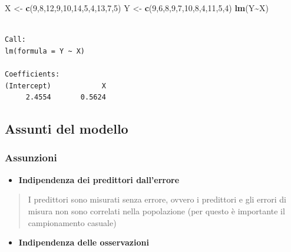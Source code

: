 \documentclass[
  a4paper,
  DIV=11,
  numbers=noendperiod]{scrreprt}
\newenvironment{Shaded}{\begin{snugshade}}{\end{snugshade}}
\newcommand{\DecValTok}[1]{\textcolor[rgb]{0.00,0.00,0.81}{#1}}
\newcommand{\FunctionTok}[1]{\textcolor[rgb]{0.13,0.29,0.53}{\textbf{#1}}}
\newcommand{\NormalTok}[1]{#1}
\newcommand{\OtherTok}[1]{\textcolor[rgb]{0.56,0.35,0.01}{#1}}
\newcommand{\SpecialCharTok}[1]{\textcolor[rgb]{0.81,0.36,0.00}{\textbf{#1}}}
\providecommand{\tightlist}{%
  \setlength{\itemsep}{0pt}\setlength{\parskip}{0pt}}
\begin{document}
\begin{Shaded}
\begin{Highlighting}[]
\NormalTok{X }\OtherTok{\textless{}{-}} \FunctionTok{c}\NormalTok{(}\DecValTok{9}\NormalTok{,}\DecValTok{8}\NormalTok{,}\DecValTok{12}\NormalTok{,}\DecValTok{9}\NormalTok{,}\DecValTok{10}\NormalTok{,}\DecValTok{14}\NormalTok{,}\DecValTok{5}\NormalTok{,}\DecValTok{4}\NormalTok{,}\DecValTok{13}\NormalTok{,}\DecValTok{7}\NormalTok{,}\DecValTok{5}\NormalTok{)}
\NormalTok{Y }\OtherTok{\textless{}{-}} \FunctionTok{c}\NormalTok{(}\DecValTok{9}\NormalTok{,}\DecValTok{6}\NormalTok{,}\DecValTok{8}\NormalTok{,}\DecValTok{9}\NormalTok{,}\DecValTok{7}\NormalTok{,}\DecValTok{10}\NormalTok{,}\DecValTok{8}\NormalTok{,}\DecValTok{4}\NormalTok{,}\DecValTok{11}\NormalTok{,}\DecValTok{5}\NormalTok{,}\DecValTok{4}\NormalTok{)}
\FunctionTok{lm}\NormalTok{(Y}\SpecialCharTok{\textasciitilde{}}\NormalTok{X)}
\end{Highlighting}
\end{Shaded}

\begin{verbatim}

Call:
lm(formula = Y ~ X)

Coefficients:
(Intercept)            X  
     2.4554       0.5624  
\end{verbatim}

\subsection{Assunti del modello}\label{assunti-del-modello}

\subsubsection{Assunzioni}\label{assunzioni}

\begin{itemize}
\tightlist
\item
  \textbf{Indipendenza dei predittori dall'errore}
\end{itemize}

\vspace{1.5mm}

\begin{quote}
I predittori sono misurati senza errore, ovvero i predittori e gli
errori di misura non sono correlati nella popolazione (per questo è
importante il campionamento casuale)
\end{quote}

\begin{itemize}
\tightlist
\item
  \textbf{Indipendenza delle osservazioni}
\end{itemize}
\end{document}
